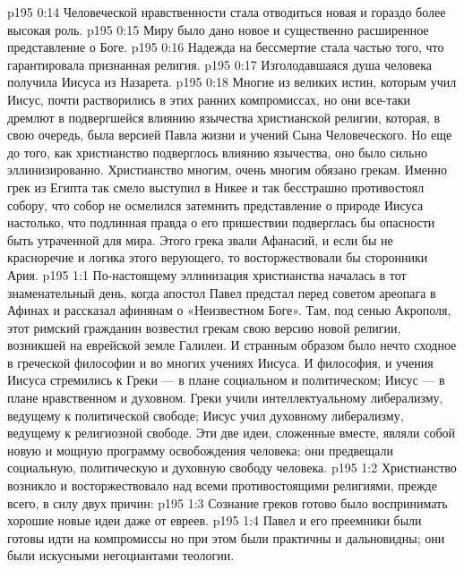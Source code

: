 \vs p195 0:14 \bibnobreakspace Человеческой нравственности стала отводиться новая и гораздо более высокая роль.
\vs p195 0:15 \pc {}\bibnobreakspace Миру было дано новое и существенно расширенное представление о Боге.
\vs p195 0:16 \pc {}\bibnobreakspace Надежда на бессмертие стала частью того, что гарантировала признанная религия.
\vs p195 0:17 \pc {}\bibnobreakspace Изголодавшаяся душа человека получила Иисуса из Назарета.
\vs p195 0:18 \pc Многие из великих истин, которым учил Иисус, почти растворились в этих ранних компромиссах, но они все\hyp{}таки дремлют в подвергшейся влиянию язычества христианской религии, которая, в свою очередь, была версией Павла жизни и учений Сына Человеческого. Но еще до того, как христианство подверглось влиянию язычества, оно было сильно эллинизированно. Христианство многим, очень многим обязано грекам. Именно грек из Египта так смело выступил в Никее и так бесстрашно противостоял собору, что собор не осмелился затемнить представление о природе Иисуса настолько, что подлинная правда о его пришествии подверглась бы опасности быть утраченной для мира. Этого грека звали Афанасий, и если бы не красноречие и логика этого верующего, то восторжествовали бы сторонники Ария.
\vs p195 1:1 По\hyp{}настоящему эллинизация христианства началась в тот знаменательный день, когда апостол Павел предстал перед советом ареопага в Афинах и рассказал афинянам о «Неизвестном Боге». Там, под сенью Акрополя, этот римский гражданин возвестил грекам свою версию новой религии, возникшей на еврейской земле Галилеи. И странным образом было нечто сходное в греческой философии и во многих учениях Иисуса. И философия, и учения Иисуса стремились к  Греки --- в плане социальном и политическом; Иисус --- в плане нравственном и духовном. Греки учили интеллектуальному либерализму, ведущему к политической свободе; Иисус учил духовному либерализму, ведущему к религиозной свободе. Эти две идеи, сложенные вместе, являли собой новую и мощную программу освобождения человека; они предвещали социальную, политическую и духовную свободу человека.
\vs p195 1:2 Христианство возникло и восторжествовало над всеми противостоящими религиями, прежде всего, в силу двух причин:
\vs p195 1:3 \bibnobreakspace Сознание греков готово было воспринимать хорошие новые идеи даже от евреев.
\vs p195 1:4 \bibnobreakspace Павел и его преемники были готовы идти на компромиссы но при этом были практичны и дальновидны; они были искусными негоциантами теологии.
